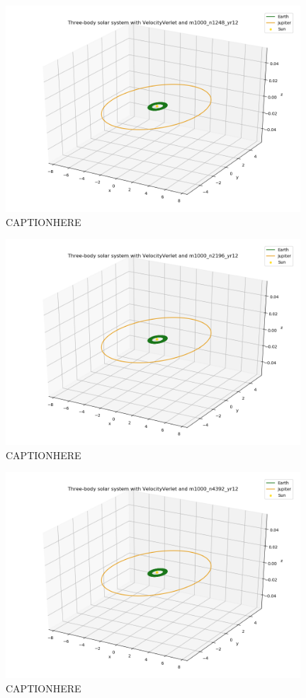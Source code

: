 \documentclass{article}
\begin{document}
    \begin{figure}[H]
        \centering
        \includegraphics[width = 11cm]{img/plot3D_S_E_J_V_m1000_n1248_yr12.png}
        \caption{CAPTIONHERE}
        \label{fig:plot3D_S_E_J_V_m1000_n1248_yr12}
    \end{figure}

    \begin{figure}[H]
        \centering
        \includegraphics[width = 11cm]{img/plot3D_S_E_J_V_m1000_n2196_yr12.png}
        \caption{CAPTIONHERE}
        \label{fig:plot3D_S_E_J_V_m1000_n2196_yr12}
    \end{figure}

    \begin{figure}[H]
        \centering
        \includegraphics[width = 11cm]{img/plot3D_S_E_J_V_m1000_n4392_yr12.png}
        \caption{CAPTIONHERE}
        \label{fig:plot3D_S_E_J_V_m1000_n4392_yr12}
    \end{figure}
\end{document}
